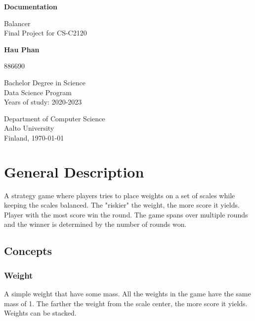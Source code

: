\documentclass[12pt]{article}
\begin{document}
\begin{titlepage}
    \thispagestyle{fancy}
    \begin{center}
        \vspace*{1cm}
            
        \huge
        \textbf{Documentation}
            
        \vspace{0.5cm}
        \Large
        Balancer\\

        \normalsize
        \vspace{0.5cm}
        Final Project for CS-C2120
            
        \vspace{1.5cm}
            
        \textbf{Hau Phan}

        \normalsize
        886690
            
        \vfill

            
        Bachelor Degree in Science\\
        Data Science Program\\
        Years of study: 2020-2023
            
        \vspace{0.8cm}
            
        \normalsize
        Department of Computer Science\\
        Aalto University\\
        Finland, \today
    \end{center}
\end{titlepage}
\newpage

\tableofcontents
{}
\newpage

\section{General Description}
A strategy game where players tries to place weights on a set of scales while
keeping the scales balanced. The "riskier" the weight, the more score it yields.
Player with the most score win the round. The game spans over multiple rounds
and the winner is determined by the number of rounds won.
\subsection{Concepts}
\subsubsection{Weight}
A simple weight that have some mass. All the weights in the game have the same
mass of 1. The farther the weight from the scale center, the more score it
yields. Weights can be stacked.
\end{document}
